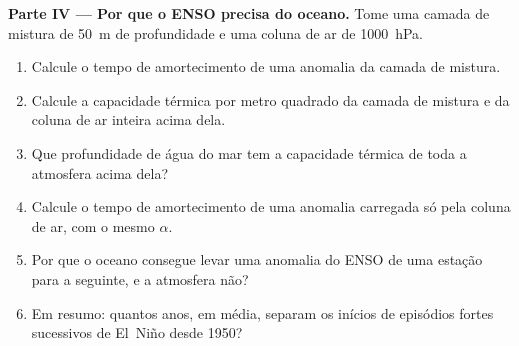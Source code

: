 \begin{problem}
\medskip\noindent\textbf{Parte IV --- Por que o ENSO precisa do oceano.}
Tome uma camada de mistura de \qty{50}{m} de profundidade e uma coluna de ar de \qty{1000}{hPa}.
\begin{enumerate}[resume]
  \item Calcule o tempo de amortecimento de uma anomalia da camada de mistura.
  \item Calcule a capacidade térmica por metro quadrado da camada de mistura e da coluna de ar
        inteira acima dela.
  \item Que profundidade de água do mar tem a capacidade térmica de toda a atmosfera acima dela?
  \item Calcule o tempo de amortecimento de uma anomalia carregada só pela coluna de ar, com o mesmo
        $\alpha$.
  \item Por que o oceano consegue levar uma anomalia do ENSO de uma estação para a seguinte, e a
        atmosfera não?
  \item Em resumo: quantos anos, em média, separam os inícios de episódios fortes sucessivos de El~Niño
        desde 1950?
\end{enumerate}
\end{problem}
